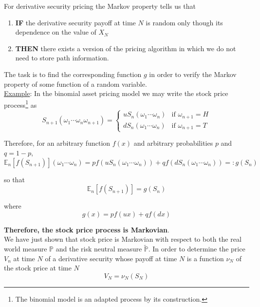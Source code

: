 \documentclass[12pt]{article}
\newlength\tindent
\renewcommand{\indent}{\hspace*{\tindent}}
\renewcommand{\P}{\mathbb P}
\newcommand{\E}{\mathbb E}
\begin{document}
For derivative security pricing the Markov property tells us that
\begin{enumerate}[]
	\item {\bf IF} the derivative security payoff at time $N$ is random only though its dependence on the value of $X_N$
	\item {\bf THEN} there exists a version of the pricing algorithm in which we do not need to store path information.
\end{enumerate}

\indent The task is to find the corresponding function $g$ in order to verify the Markov property of some function of a random variable. \\

\underline{Example}: In the binomial asset pricing model we may write the stock price process\footnote{The binomial model is an adapted process by its construction.} as
\begin{equation*}
	S_{n + 1}(\omega_1\cdots\omega_n\omega_{n + 1}) = 
	\begin{cases}
		uS_n(\omega_1\cdots\omega_n) & \text{if } \omega_{n + 1} = H \\
		dS_n(\omega_1\cdots\omega_n) & \text{if } \omega_{n + 1} = T
	\end{cases}
\end{equation*}

Therefore, for an arbitrary function $f(x)$ and arbitrary probabilities $p$ and $q = 1 - p$,
\begin{equation*}
	\E_n \left[f(S_{n + 1}) \right](\omega_1\cdots\omega_n) = pf(uS_n(\omega_1\cdots\omega_n)) + qf(dS_n(\omega_1\cdots\omega_n)) =: g(S_n)
\end{equation*}

so that
\begin{equation*}
	\E_n \left[ f(S_{n + 1}) \right] = g(S_n)
\end{equation*}

where
\begin{equation*}
	g(x) = pf(ux) + qf(dx)
\end{equation*}

{\bf Therefore, the stock price process is Markovian}. \\

\indent We have just shown that stock price is Markovian with respect to both the real world measure $\P$ and the risk neutral measure $\tilde{\P}$. In order to determine the price $V_n$ at time $N$ of a derivative security whose payoff at time $N$ is a function $\nu_N$ of the stock price at time $N$
\begin{equation*}
	V_N = \nu_N(S_N)
\end{equation*}
\end{document}
